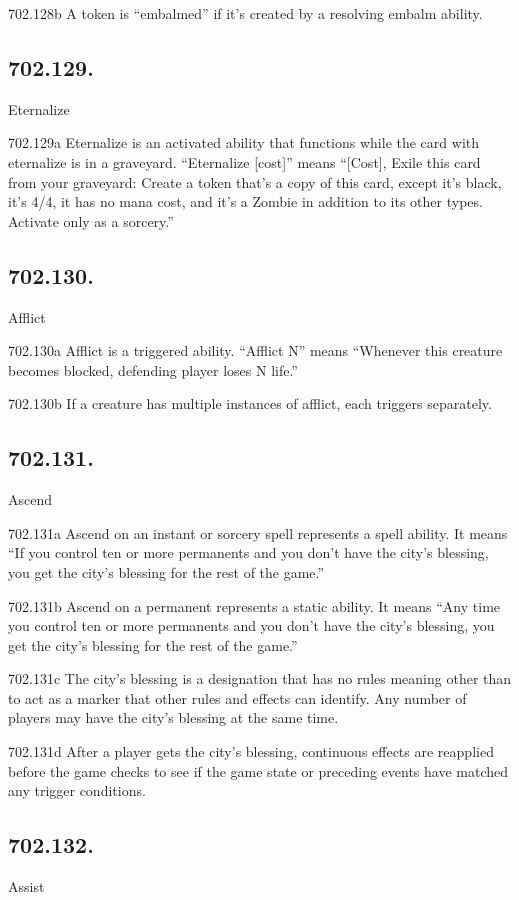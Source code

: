 702.128b A token is “embalmed” if it’s created by a resolving embalm ability.

\subsection*{702.129.}
Eternalize

702.129a Eternalize is an activated ability that functions while the card with eternalize is in a graveyard. “Eternalize [cost]” means “[Cost], Exile this card from your graveyard: Create a token that’s a copy of this card, except it’s black, it’s 4/4, it has no mana cost, and it’s a Zombie in addition to its other types. Activate only as a sorcery.”

\subsection*{702.130.}
Afflict

702.130a Afflict is a triggered ability. “Afflict N” means “Whenever this creature becomes blocked, defending player loses N life.”

702.130b If a creature has multiple instances of afflict, each triggers separately.

\subsection*{702.131.}
Ascend

702.131a Ascend on an instant or sorcery spell represents a spell ability. It means “If you control ten or more permanents and you don’t have the city’s blessing, you get the city’s blessing for the rest of the game.”

702.131b Ascend on a permanent represents a static ability. It means “Any time you control ten or more permanents and you don’t have the city’s blessing, you get the city’s blessing for the rest of the game.”

702.131c The city’s blessing is a designation that has no rules meaning other than to act as a marker that other rules and effects can identify. Any number of players may have the city’s blessing at the same time.

702.131d After a player gets the city’s blessing, continuous effects are reapplied before the game checks to see if the game state or preceding events have matched any trigger conditions.

\subsection*{702.132.}
Assist

